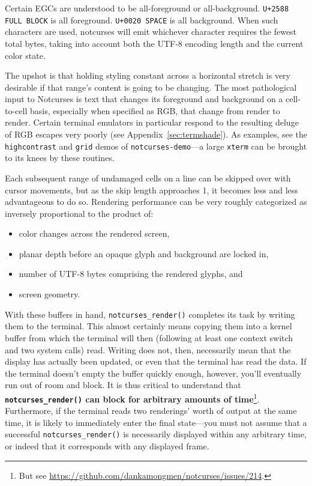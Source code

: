 \documentclass[letterpaper,10pt]{article}
\newenvironment{denseitemize}{
  \begin{itemize}
      \setlength{\itemsep}{0pt}
}{
  \end{itemize}
}
\begin{document}
Certain EGCs are understood to be all-foreground or all-background.
\texttt{U+2588 FULL BLOCK} is all foreground. \texttt{U+0020 SPACE} is all
background. When such characters are used, notcurses will emit whichever
character requires the fewest total bytes, taking into account both the
UTF-8 encoding length and the current color state.

The upshot is that holding styling constant across a horizontal stretch is
very desirable if that range's content is going to be changing. The most
pathological input to Notcurses is text that changes its foreground and background
on a cell-to-cell basis, especially when specified as RGB, that change from
render to render. Certain terminal emulators in particular respond to the
resulting deluge of RGB escapes very poorly (see Appendix~\ref{sec:termshade}).
As examples, see the \texttt{highcontrast} and \texttt{grid} demos of
\texttt{notcurses-demo}---a large \texttt{xterm} can be brought to its knees
by these routines.

Each subsequent range of undamaged cells on a line can be skipped over with
cursor movements, but as the skip length approaches 1, it becomes less and
less advantageous to do so. Rendering performance can be very roughly
categorized as inversely proportional to the product of:

\begin{denseitemize}
\item{color changes across the rendered screen,}
\item{planar depth before an opaque glyph and background are locked in,}
\item{number of UTF-8 bytes comprising the rendered glyphs, and}
\item{screen geometry.}
\end{denseitemize}

With these buffers in hand, \texttt{notcurses\_render()} completes its task by
writing them to the terminal. This almost certainly means copying
them into a kernel buffer from which the terminal will then (following at
least one context switch and two system calls) read. Writing does not,
then, necessarily mean that the display has actually been updated, or even
that the terminal has read the data. If the terminal doesn't empty the buffer
quickly enough, however, you'll eventually run out of room and block. It is
thus critical to understand that \textbf{\texttt{notcurses\_render()} can block
for arbitrary amounts of time}\footnote{But see
\url{https://github.com/dankamongmen/notcurses/issues/214}.}. Furthermore,
if the terminal reads two renderings' worth of output at the same time, it is
likely to immediately enter the final state---you must not assume that a successful
\texttt{notcurses\_render()} is necessarily displayed within any arbitrary time,
or indeed that it corresponds with any displayed frame.
\end{document}
